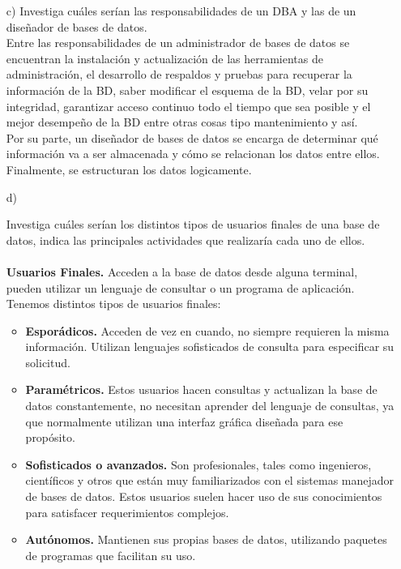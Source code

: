 \documentclass[a4paper, 12pt]{report}
\begin{document}
\begin{enumerate}
{\begin{enumerate}
    \item[c)]{Investiga cuáles serían las responsabilidades de un DBA y las de
                un diseñador de bases de datos.\\
        Entre las responsabilidades de un administrador de bases de datos se
        encuentran la instalación y actualización de las herramientas de administración,
        el desarrollo de respaldos y pruebas para recuperar la información de la BD,
        saber modificar el esquema de la BD, velar por su integridad, garantizar
        acceso continuo todo el tiempo que sea posible y el mejor desempeño de la BD
        entre otras cosas tipo mantenimiento y así.\cite{DBA}\\
        Por su parte, un diseñador de bases de datos se encarga de determinar qué
        información va a ser almacenada y cómo se relacionan los datos entre ellos.
        Finalmente, se estructuran los datos logicamente.}
    \item[d)]{Investiga  cuáles  serían  los distintos tipos de
     usuarios finales de una base de datos, indica las principales
     actividades que realizaría cada uno de ellos. \\\\
     \textbf{Usuarios Finales.} Acceden a la base de datos desde
     alguna terminal, pueden utilizar un lenguaje de consultar o un
     programa de aplicación. Tenemos distintos tipos de usuarios
     finales:
     \begin{itemize}
       \item \textbf{Esporádicos.} Acceden de vez en cuando, no
       siempre requieren la misma información. Utilizan lenguajes
       sofisticados de consulta para especificar su solicitud.\\
       \item \textbf{Paramétricos.} Estos usuarios hacen consultas
       y actualizan la base de datos constantemente, no necesitan
       aprender del lenguaje de consultas, ya que normalmente
       utilizan una interfaz gráfica diseñada para ese propósito.
       \item \textbf{Sofisticados o avanzados.} Son profesionales,
       tales como ingenieros, científicos y otros que están muy
       familiarizados con el sistemas manejador de bases de datos.
       Estos usuarios suelen hacer uso de sus conocimientos para
       satisfacer requerimientos complejos.
       \item \textbf{Autónomos.} Mantienen sus propias bases de datos, utilizando paquetes de programas que facilitan su uso.


\end{itemize}}
\end{enumerate}}
\end{enumerate}
\end{document}
